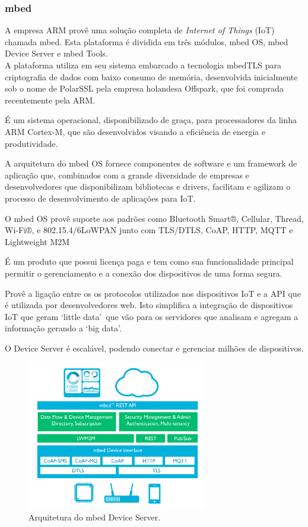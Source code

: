 \subsubsection{mbed}
A empresa ARM provê uma solução completa de \textit{Internet of Things} (IoT) chamada mbed\cite{mbed}.
Esta plataforma é dividida em três módulos, mbed OS, mbed Device Server e mbed Tools.\\
A plataforma utiliza em seu sistema embarcado a tecnologia mbedTLS para criptografia de dados com baixo
consumo de memória, desenvolvida inicialmente sob o nome de PolarSSL pela empresa holandesa Offspark,
que foi comprada recentemente pela ARM.

É um sistema operacional, disponibilizado de graça, para processadores da linha ARM Cortex-M, que são
desenvolvidos visando a eficiência de energia e produtividade.

A arquitetura do mbed OS fornece componentes de software e um framework de aplicação que, combinados
com a grande diversidade de empresas e desenvolvedores que disponibilizam bibliotecas e drivers, facilitam
e agilizam o processo de desenvolvimento de aplicações para IoT.

O mbed OS provê suporte aos padrões como Bluetooth Smart®, Cellular, Thread, Wi-Fi®, e 802.15.4/6LoWPAN junto
com TLS/DTLS, CoAP, HTTP, MQTT e Lightweight M2M

É um produto que possui licença paga e tem como sua funcionalidade principal permitir o gerenciamento
e a conexão dos dispositivos de uma forma segura.

Provê a ligação entre os os protocolos utilizados nos dispositivos IoT e a API que é utilizada por
desenvolvedores web. Isto simplifica a integração de dispositivos IoT que geram \lq little data\rq\ que vão
para os servidores que analisam e agregam a informação gerando a \lq big data\rq.

O Device Server é escalável, podendo conectar e gerenciar milhões de dispositivos.
\begin{figure}[H]
	\centering
		\includegraphics[width=0.7\textwidth]{fig/mbed_arch.png}
	\caption{Arquitetura do mbed Device Server.}
\end{figure}

